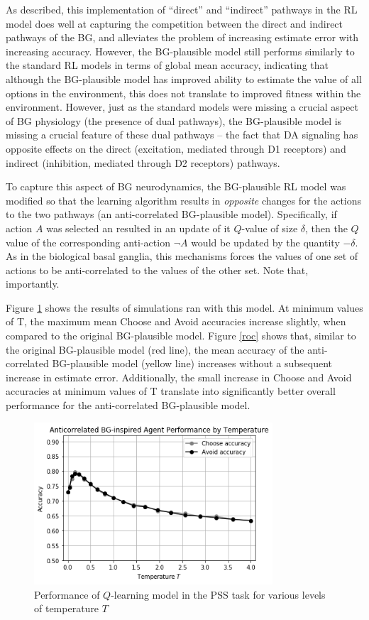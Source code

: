 \documentclass[10pt,letterpaper]{article}
\begin{document}
As described, this implementation of ``direct'' and ``indirect'' pathways in the RL model does well at capturing the competition between the direct and indirect pathways of the BG, and alleviates the problem of increasing estimate error with increasing accuracy. However, the BG-plausible model still performs similarly to the standard RL models in terms of global mean accuracy, indicating that although the BG-plausible model has improved ability to estimate the value of all options in the environment, this does not translate to improved fitness within the environment. However, just as the standard models were missing a crucial aspect of BG physiology (the presence of dual pathways), the BG-plausible model is missing a crucial feature of these dual pathways – the fact that DA signaling has opposite effects on the direct (excitation, mediated through D1 receptors) and indirect (inhibition, mediated through D2 receptors) pathways. 

To capture this aspect of BG neurodynamics, the BG-plausible RL model was modified so that the learning algorithm results in \emph{opposite} changes for the actions to the two pathways (an anti-correlated BG-plausible model). Specifically, if action $A$ was selected an resulted in an update  of it $Q$-value of size $\delta$, then the $Q$ value of the corresponding anti-action $\neg A$ would be updated by the quantity $-\delta$. As in the biological basal ganglia, this mechanisms forces the values of one set of actions to be anti-correlated to the values of the other set. Note that, importantly.

Figure \ref{bg-anti-agent} shows the results of simulations ran with this model. At minimum values of T, the maximum mean Choose and Avoid accuracies increase slightly, when compared to the original BG-plausible model. Figure \ref{roc} shows that, similar to the original BG-plausible model (red line), the mean accuracy of the anti-correlated BG-plausible model (yellow line) increases without a subsequent increase in estimate error. Additionally, the small increase in Choose and Avoid accuracies at minimum values of T translate into significantly better overall performance for the anti-correlated BG-plausible model. 

\begin{figure}[ht]
	\begin{center}
		\includegraphics[width=3.5in]{bg-anti-agent-performance.png}
	\end{center}
	\caption{Performance of $Q$-learning model in the PSS task for various levels of temperature $T$} 
	\label{bg-anti-agent}
\end{figure}
\end{document}
